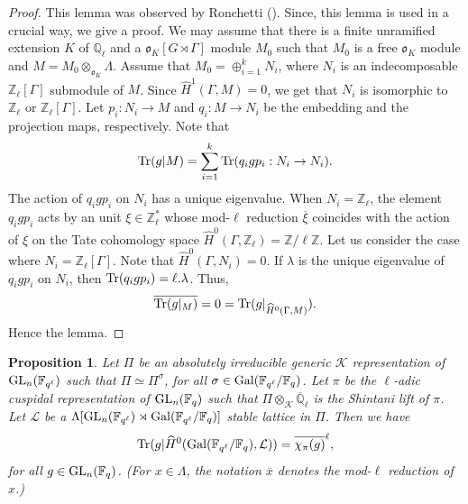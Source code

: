 \documentclass[10pt, reqno]{amsart}
\theoremstyle{plain}
\numberwithin{equation}{section} \newcommand{\di}{\operatorname{dim}}
\newtheorem{proposition}[theorem]{Proposition}
\begin{document}
\begin{proof}
  This lemma was observed by Ronchetti (\cite[Theorem
  12]{Ronchetti_BC}).  Since, this lemma is used in a crucial way, we
  give a proof.  We may assume that there is a finite unramified
  extension $K$ of $\mathbb{Q}_\ell$ and a
  $\mathfrak{o}_K[G\rtimes \Gamma]$ module $M_0$ such that $M_0$ is a
  free $\mathfrak{o}_K$ module and
  $M=M_0\otimes_{\mathfrak{o}_K} \Lambda$.  Assume that
  $M_0=\oplus_{i=1}^kN_i$, where $N_i$ is an indecomposable
  $\mathbb{Z}_\ell[\Gamma]$ submodule of $M$. Since
  $\widehat{H}^1(\Gamma, M)=0$, we get that $N_i$ is isomorphic to
  $\mathbb{Z}_\ell$ or $\mathbb{Z}_\ell[\Gamma]$.  Let
  $p_i:N_i\rightarrow M$ and $q_i:M\rightarrow N_i$ be the embedding
  and the projection maps, respectively.  Note that
  $${\rm Tr}(g|M)=\sum_{i=1}^k{\rm Tr}(q_igp_i : N_i\rightarrow
  N_i).$$ The action of $q_igp_i$ on $N_i$ has a unique
  eigenvalue. When $N_i=\mathbb{Z}_\ell$, the element $q_igp_i$ acts
  by an unit $\xi\in \mathbb{Z}_\ell^\ast$ whose mod-$\ell$ reduction
  $\overline{\xi}$ coincides with the action of $\xi$ on the Tate
  cohomology space
  $\widehat{H}^0(\Gamma, \mathbb{Z}_\ell) =
  \mathbb{Z}/\ell\mathbb{Z}$. Let us consider the case where
  $N_i=\mathbb{Z}_\ell[\Gamma]$. Note that
  $\widehat{H}^0(\Gamma, N_i)=0$. If $\lambda$ is the unique
  eigenvalue of $q_igp_i$ on ${N_i}$, then
  ${\rm Tr}(q_igp_i) = \ell.\lambda$. Thus,
$$ \overline{{\rm Tr}(g|_{M})} = 0 = {\rm Tr}(g|_{\widehat{H}^0(\Gamma, M)}). $$
Hence the lemma.
\end{proof}	
\begin{proposition}\label{char_iden_3}
  Let $\Pi$ be an absolutely irreducible generic
  $\mathcal{K}$ representation of ${\rm GL}_n(\mathbb{F}_{q^\ell})$
  such that $\Pi\simeq \Pi^\sigma$, for all
  $\sigma\in {\rm Gal}(\mathbb{F}_{q^\ell}/\mathbb{F}_q)$. Let $\pi$
  be the $\ell$-adic cuspidal representation of
  ${\rm GL}_{n}(\mathbb{F}_q)$ such that
  $\Pi\otimes_{\mathcal{K}} \overline{\mathbb{Q}}_\ell$ is the
  Shintani lift of $\pi$.  Let $\mathcal{L}$ be a
  $\Lambda[{\rm GL}_n(\mathbb{F}_{q^\ell})\rtimes {\rm
    Gal}(\mathbb{F}_{q^\ell}/ \mathbb{F}_q)]$ stable lattice in
  $\Pi$. Then we have
$${\rm Tr}(g|\widehat{H}^0({\rm Gal}(\mathbb{F}_{q^\ell}/\mathbb{F}_q), 
\mathcal{L})) = \overline{\chi_\pi(g)}^\ell,$$
for all $g\in {\rm GL}_n(\mathbb{F}_q)$. (For $x\in \Lambda$, the notation 
$\overline{x}$ denotes the mod-$\ell$ reduction of $x$.)
\end{proposition}
\end{document}
